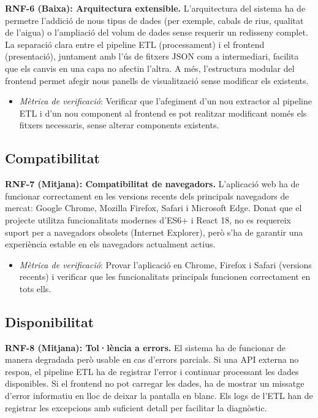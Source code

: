 \textbf{RNF-6 (Baixa): Arquitectura extensible.} L'arquitectura del sistema ha de permetre l'addició de nous tipus de dades (per exemple, cabals de rius, qualitat de l'aigua) o l'ampliació del volum de dades sense requerir un redisseny complet. La separació clara entre el pipeline ETL (processament) i el frontend (presentació), juntament amb l'ús de fitxers JSON com a intermediari, facilita que els canvis en una capa no afectin l'altra. A més, l'estructura modular del frontend permet afegir nous panells de visualització sense modificar els existents.

\begin{itemize}
    \item \textit{Mètrica de verificació}: Verificar que l'afegiment d'un nou extractor al pipeline ETL i d'un nou component al frontend es pot realitzar modificant només els fitxers necessaris, sense alterar components existents.
\end{itemize}

\subsection{Compatibilitat}

\textbf{RNF-7 (Mitjana): Compatibilitat de navegadors.} L'aplicació web ha de funcionar correctament en les versions recents dels principals navegadors de mercat: Google Chrome, Mozilla Firefox, Safari i Microsoft Edge. Donat que el projecte utilitza funcionalitats modernes d'ES6+ i React 18, no es requereix suport per a navegadors obsolets (Internet Explorer), però s'ha de garantir una experiència estable en els navegadors actualment actius.

\begin{itemize}
    \item \textit{Mètrica de verificació}: Provar l'aplicació en Chrome, Firefox i Safari (versions recents) i verificar que les funcionalitats principals funcionen correctament en tots ells.
\end{itemize}

\subsection{Disponibilitat}

\textbf{RNF-8 (Mitjana): Tol·lència a errors.} El sistema ha de funcionar de manera degradada però usable en cas d'errors parcials. Si una API externa no respon, el pipeline ETL ha de registrar l'error i continuar processant les dades disponibles. Si el frontend no pot carregar les dades, ha de mostrar un missatge d'error informatiu en lloc de deixar la pantalla en blanc. Els logs de l'ETL han de registrar les excepcions amb suficient detall per facilitar la diagnòstic.

